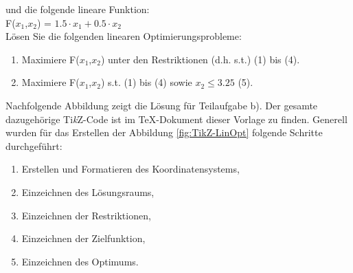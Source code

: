 \documentclass[13pt,a4paper, listof=entryprefix, bibliography=totocnumbered,toc=listofnumbered,lof=listofnumbered]{scrartcl}
\begin{document}
und die folgende lineare Funktion: \\
F($x_1$,$x_2$) = $1.5 \cdot x_1 + 0.5 \cdot x_2$  \\

Lösen Sie die folgenden linearen Optimierungsprobleme:

\begin{enumerate} [leftmargin=*, label= (\alph*)]
	\item Maximiere F($x_1$,$x_2$) unter den Restriktionen (d.h. s.t.) (1) bis (4).
	\item Maximiere F($x_1$,$x_2$) s.t. (1) bis (4)  sowie $x_2 \le 3.25$ (5).\\
\end{enumerate}



Nachfolgende Abbildung zeigt die Lösung für Teilaufgabe b).
Der gesamte dazugehörige Ti\textit{k}Z-Code ist im TeX-Dokument dieser Vorlage zu finden. Generell wurden für das Erstellen der Abbildung \ref{fig:TikZ-LinOpt} folgende Schritte durchgeführt:
\begin{enumerate}
	\item Erstellen und Formatieren des Koordinatensystems,
	\item Einzeichnen des Lösungsraums,
	\item Einzeichnen der Restriktionen,
	\item Einzeichnen der Zielfunktion,
	\item Einzeichnen des Optimums.\\
\end{enumerate}
\end{document}
